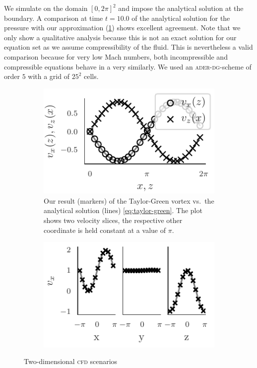 \documentclass[runningheads]{llncs}
\newcommand{\aderdg}{\textsc{ader-dg}}
\begin{document}
We simulate on the domain $[0,2\pi]^2$ and impose the analytical solution at the boundary.
A comparison at time $t = 10.0$ of the analytical solution for the pressure with our approximation (\cref{fig:taylor-green}) shows excellent agreement.
Note that we only show a qualitative analysis because this is not an exact solution for our equation set as we assume compressibility of the fluid.
This is nevertheless a valid comparison because for very low Mach numbers, both incompressible and compressible equations behave in a very similarly.
We used an \aderdg{}-scheme of order $5$ with a grid of $25^2$ cells.
%
\begin{figure}[tb]
  \centering
  \begin{subfigure}[t]{0.473\textwidth}
    \centering
    \includegraphics{CP032_fig2}
    \caption{\label{fig:taylor-green}Our result (markers) of the Taylor-Green vortex vs.\ the analytical solution (lines) \cref{eq:taylor-green}.
    The plot shows two velocity slices, the respective other coordinate is held constant at a value of $\pi$.}
  \end{subfigure}\qquad%
\begin{subfigure}[t]{.473\textwidth}
  \centering
    \includegraphics{CP032_fig3}
\end{subfigure}
  \caption{\label{fig:cdf-results}Two-dimensional \textsc{cfd} scenarios}
\end{figure}
\end{document}
